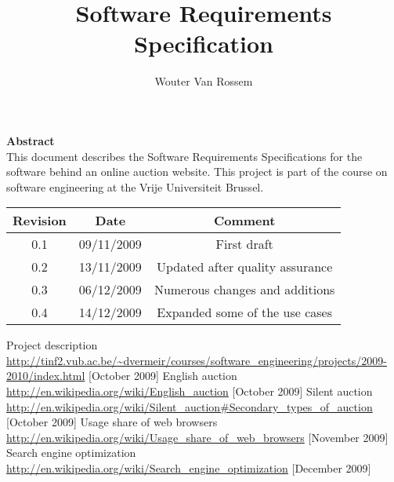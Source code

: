 \documentclass{report}
\begin{document}
\title{Software Requirements Specification}
\author{Wouter Van Rossem}

\maketitle
\begin{center}
	\textbf{Abstract} \\
	This document describes the Software Requirements Specifications for
	the software behind an online auction website. This project is part of 
	the course on software engineering at the Vrije Universiteit Brussel.
	\bigskip
\begin{tabular}{|c|c|c|}
	\hline  \textbf{Revision} & \textbf{Date} & \textbf{Comment} \\ 
	\hline 0.1 & 09/11/2009 & First draft \\ 
	\hline 0.2 & 13/11/2009 & Updated after quality assurance \\ 
	\hline 0.3 & 06/12/2009 & Numerous changes and additions \\ 
	\hline 0.4 & 14/12/2009 & Expanded some of the use cases \\
	\hline 
\end{tabular} 
\end{center}
\tableofcontents








\begin{thebibliography}{9}
 Project description \\		
	\url{http://tinf2.vub.ac.be/~dvermeir/courses/software_engineering/projects/2009-2010/index.html} [October 2009]
 English auction \\ 
	\url{http://en.wikipedia.org/wiki/English_auction} [October 2009]
 Silent auction \\
	\url{http://en.wikipedia.org/wiki/Silent_auction#Secondary_types_of_auction} [October 2009]
 Usage share of web browsers \\
	\url{http://en.wikipedia.org/wiki/Usage_share_of_web_browsers} [November 2009]
 Search engine optimization \\
	\url{http://en.wikipedia.org/wiki/Search_engine_optimization} [December 2009]
\end{thebibliography}

\end{document}
